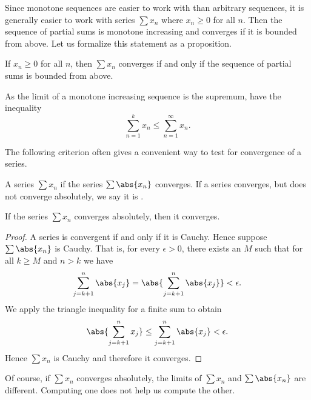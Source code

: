 \documentclass[12pt]{book}
\begin{document}
Since monotone sequences are easier to work with than arbitrary sequences, it
is generally easier to work with series $\sum x_n$ where $x_n \geq 0$ for
all $n$.
Then the sequence of partial sums is monotone increasing
and converges if it is bounded from above.
Let us formalize this statement as a proposition.

\begin{prop}
If $x_n \geq 0$ for all $n$, then $\sum x_n$ converges if and only if
the sequence of partial sums is bounded from above.
\end{prop}

As the limit of a monotone increasing sequence is the supremum, have the
inequality
\begin{equation*}
\sum_{n=1}^k x_n \leq
\sum_{n=1}^\infty x_n .
\end{equation*}

The following criterion often gives a convenient way to test for convergence
of a series.

\begin{defn}
A series $\sum x_n$
\emph{} if
the series $\sum \abs{x_n}$ converges.
If a series converges, but does not converge absolutely, we say
it is \emph{}.
\end{defn}

\begin{prop}
If the series $\sum x_n$ converges absolutely, then it converges.
\end{prop}

\begin{proof}
A series is convergent if and only if it is Cauchy.
Hence
suppose $\sum \abs{x_n}$ is Cauchy.
That is, for every $\epsilon > 0$,
there exists an $M$ such that for all $k \geq M$ and $n > k$ we have 
\begin{equation*}
\sum_{j=k+1}^n \abs{x_j} 
=
\abs{ \sum_{j=k+1}^n \abs{x_j} }
<
\epsilon .
\end{equation*}
We apply the triangle inequality for a finite sum to obtain
\begin{equation*}
\abs{ \sum_{j=k+1}^n x_j }
\leq
\sum_{j=k+1}^n \abs{x_j}
<
\epsilon .
\end{equation*}
Hence $\sum x_n$ is Cauchy and therefore it converges.
\end{proof}

Of course, if $\sum x_n$ converges absolutely, the limits of
$\sum x_n$ and $\sum \abs{x_n}$ are different.
Computing one
does not help us compute the other.
\end{document}
